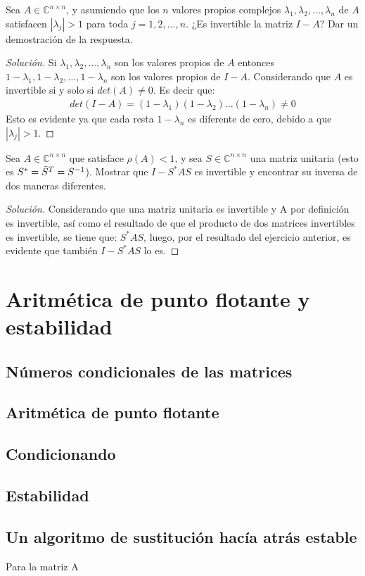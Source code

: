 \documentclass[12pt]{book}
\newcommand{\C}{\mathbb{C}}
\newcommand\abs[1]{\left\lvert#1\right\rvert}
\newenvironment{solucion}
  {\renewcommand\qedsymbol{$\square$}\begin{proof}[Solución]}
  {\end{proof}}
\begin{document}
\eje Sea $A\in\C^{n\times n}$, y asumiendo que los $n$ valores propios complejos $\lambda_1,\lambda_2,\dots,\lambda_n$ de $A$ satisfacen $\abs{\lambda_j}>1$ para toda $j=1,2,\dots,n$. ¿Es invertible la matriz $I-A$? Dar un demostración de la respuesta.
\begin{solucion}
    Si $\lambda_1,\lambda_2,\dots,\lambda_n$ son los valores propios de $A$ entonces $1-\lambda_1,1-\lambda_2,\dots,1-\lambda_n$ son los valores propios de $I-A$. Considerando que $A$ es invertible si y solo si $det(A)\neq0$. Es decir que:
    \begin{align*}
        det(I-A)=(1-\lambda_1)(1-\lambda_2)\dots(1-\lambda_n)\neq0
    \end{align*}
    Esto es evidente ya que cada resta $1-\lambda_n$ es diferente de cero, debido a que $\abs{\lambda_j}>1$.
\end{solucion}
\eje Sea $A\in\C^{n\times n}$ que satisface $\rho(A)<1$, y sea $S\in\C^{n\times n}$ una matriz unitaria (esto es $S^*=\Bar{S}^T=S^{-1}$). Mostrar que $I-S^*AS$ es invertible y encontrar su inversa de dos maneras diferentes.
\begin{solucion}
    Considerando que una matriz unitaria es invertible y A por definición es invertible, así como el resultado de que el producto de dos matrices invertibles es invertible, se tiene que: $S^*AS$, luego, por el resultado del ejercicio anterior, es evidente que también $I-S^*AS$ lo es.
\end{solucion}

\chapter{Aritmética de punto flotante y estabilidad}
\section{Números condicionales de las matrices}
\section{Aritmética de punto flotante}
\section{Condicionando}
\section{Estabilidad}
\section{Un algoritmo de sustitución hacía atrás estable}
\eje Para la matriz A
\end{document}
